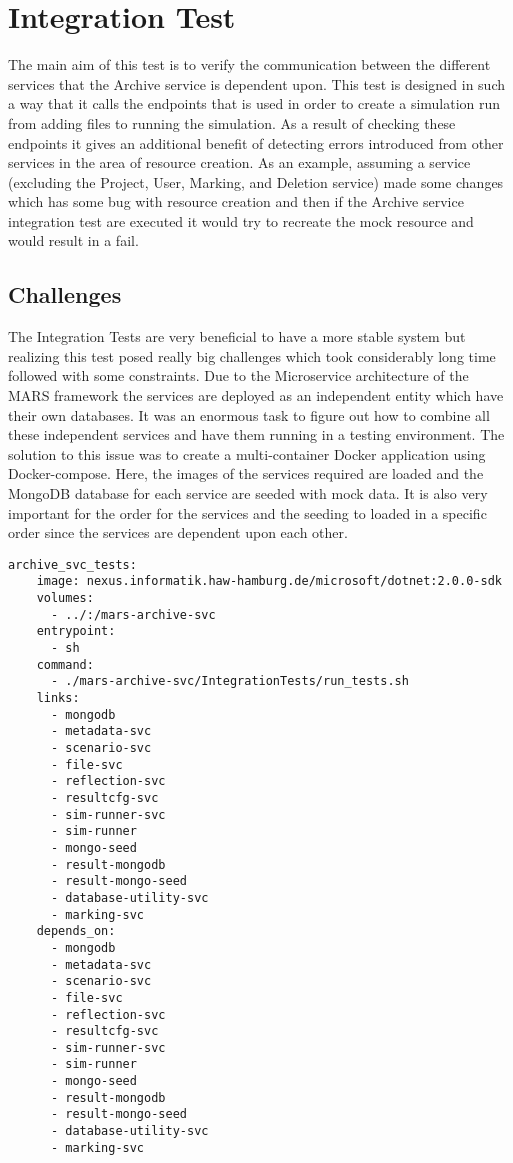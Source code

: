 \section{Integration Test}
The main aim of this test is to verify the communication between the different services that the Archive service is dependent upon. This test is designed in 
such a way that it calls the endpoints that is used in order to create a simulation run from adding files to running the simulation. As a result of checking
these endpoints it gives an additional benefit of detecting errors introduced from other services in the area of resource creation. As an example, assuming a service
(excluding the Project, User, Marking, and Deletion service)
made some changes which has some bug with resource creation and then if the Archive service integration test are executed it would try to recreate the mock resource
and would result in a fail.

\subsection{Challenges}
The Integration Tests are very beneficial to have a more stable system but realizing this test posed really big challenges which took considerably long time followed 
with some constraints. Due to the Microservice architecture of the MARS framework the services are deployed as an independent entity which have their own databases.
It was an enormous task to figure out how to combine all these independent services and have them running in a testing environment. The solution to this issue
was to create a multi-container Docker application using Docker-compose. Here, the images of the services required are loaded and the MongoDB database for each
service are seeded with mock data. It is also very important for the order for the services and the seeding to loaded in a specific order since the services are dependent upon
each other.  

\begin{lstlisting}[language=docker-compose,caption={Docker compose configuration snippet for Archive service Integration Test}, captionpos=b, breaklines=true,label={code:integCompose}]
archive_svc_tests:
    image: nexus.informatik.haw-hamburg.de/microsoft/dotnet:2.0.0-sdk
    volumes:
      - ../:/mars-archive-svc
    entrypoint:
      - sh
    command:
      - ./mars-archive-svc/IntegrationTests/run_tests.sh
    links:
      - mongodb
      - metadata-svc
      - scenario-svc
      - file-svc
      - reflection-svc
      - resultcfg-svc
      - sim-runner-svc
      - sim-runner
      - mongo-seed
      - result-mongodb
      - result-mongo-seed
      - database-utility-svc
      - marking-svc
    depends_on:
      - mongodb
      - metadata-svc
      - scenario-svc
      - file-svc
      - reflection-svc
      - resultcfg-svc
      - sim-runner-svc
      - sim-runner
      - mongo-seed
      - result-mongodb
      - result-mongo-seed
      - database-utility-svc
      - marking-svc
\end{lstlisting}      

